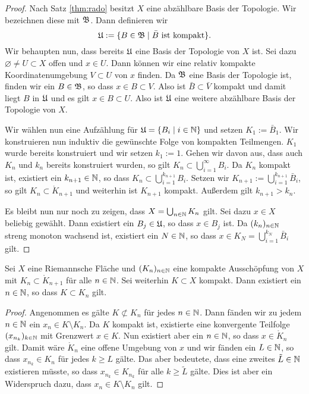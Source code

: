 \begin{proof}
  Nach Satz \ref{thm:rado} besitzt $X$ eine abzählbare Basis der
  Topologie. Wir bezeichnen diese mit $\mathfrak{B}$. Dann definieren wir
  \[
  \mathfrak{U} := \{ B \in \mathfrak{B} \mid \bar B \text{ ist kompakt}\}.
  \]
  Wir behaupten nun, dass bereits $\mathfrak{U}$ eine Basis der Topologie von
  $X$ ist. Sei dazu $\varnothing \neq U \subset X$ offen und $x \in U$. Dann
  können wir eine relativ kompakte Koordinatenumgebung $V \subset U$
  von $x$ finden. Da $\mathfrak{B}$ eine Basis der Topologie ist, finden wir
  ein $B \in \mathfrak{B}$, so dass $x \in B \subset V$. Also ist $\bar B
  \subset \bar V$ kompakt und damit liegt $B$ in $\mathfrak{U}$ und es gilt $x
  \in B \subset U$. Also ist $\mathfrak{U}$ eine weitere abzählbare Basis der
  Topologie von $X$.

  Wir wählen nun eine Aufzählung für $\mathfrak{U} = \{B_i \mid i \in \mathbb{N}\}$ und
  setzen $K_1 := \bar B_1$. Wir konstruieren nun induktiv die
  gewünschte Folge von kompakten Teilmengen. $K_1$ wurde bereits
  konstruiert und wir setzen $k_1 := 1$. Gehen wir davon aus, dass auch
  $K_n$ und $k_n$ bereits
  konstruiert wurden, so gilt $K_n \subset \bigcup_{i=1}^\infty
  B_i$. Da $K_n$ kompakt ist, existiert ein $k_{n+1} \in \mathbb{N}$, so dass $K_n
  \subset \bigcup_{i=1}^{k_{n+1}} B_i$. Setzen wir $K_{n+1} :=
  \bigcup_{i=1}^{k_{n+1}}\bar B_i$, so gilt $K_n \subset \mathring
  K_{n+1}$ und weiterhin ist $K_{n+1}$ kompakt. Außerdem gilt
  $k_{n+1} > k_n$.

  Es bleibt nun nur noch zu zeigen, dass $X = \bigcup_{n \in \mathbb{N}} K_n$
  gilt. Sei dazu $x \in X$ beliebig gewählt. Dann existiert ein $B_j \in
  \mathfrak{U}$, so dass $x \in B_j$ ist. Da $(k_n)_{n \in\mathbb{N}}$ streng monoton
  wachsend ist, existiert ein $N \in \mathbb{N}$, so dass $x \in K_N =
  \bigcup_{i=1}^{k_N} \bar B_i$ gilt.
\end{proof}

\begin{lemma}
  \label{lemma:kompakt-in-ausschöpfung}
  Sei $X$ eine Riemannsche Fläche und $(K_n)_{n \in \mathbb{N}}$ eine kompakte
  Ausschöpfung von $X$ mit $K_n \subset \mathring K_{n+1}$ für alle $n
  \in \mathbb{N}$. Sei weiterhin $K \subset X$ kompakt. Dann existiert ein $n
  \in \mathbb{N}$, so dass $K \subset K_n$ gilt.
\end{lemma}

\begin{proof}
  Angenommen es gälte $K \not \subset K_n$ für jedes $n \in \mathbb{N}$. Dann
  fänden wir zu jedem $n \in \mathbb{N}$ ein $x_n \in K\setminus K_n$. Da $K$
  kompakt ist, existierte eine konvergente Teilfolge $(x_{n_k})_{k\in
    \mathbb{N}}$ mit Grenzwert $x \in K$. Nun existiert aber ein $n \in \mathbb{N}$,
  so dass $x \in \mathring K_n$ gilt. Damit wäre $\mathring K_n$ eine offene
  Umgebung von $x$ und wir fänden ein $L \in \mathbb{N}$, so dass $x_{n_k} \in
  K_n$ für jedes $k\geq L$ gälte. Das aber bedeutete, dass eine
  zweites $\tilde L \in \mathbb{N}$ existieren müsste, so dass $x_{n_k} \in K_{n_k}$
  für alle $k \geq \tilde L$ gälte. Dies ist aber ein Widerspruch dazu,
  dass $x_n \in K \setminus K_n$ gilt.
\end{proof}



